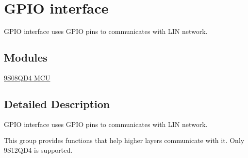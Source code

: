 \hypertarget{group___g_p_i_o__group}{}\section{G\+P\+I\+O interface}
\label{group___g_p_i_o__group}


G\+P\+I\+O interface uses G\+P\+I\+O pins to communicates with L\+I\+N network.  


\subsection*{Modules}
\begin{DoxyCompactItemize}
\item 
\hyperlink{group__s08qd4__group}{9\+S08\+Q\+D4 M\+C\+U}
\end{DoxyCompactItemize}


\subsection{Detailed Description}
G\+P\+I\+O interface uses G\+P\+I\+O pins to communicates with L\+I\+N network. 

This group provides functions that help higher layers communicate with it. Only 9\+S12\+Q\+D4 is supported. 